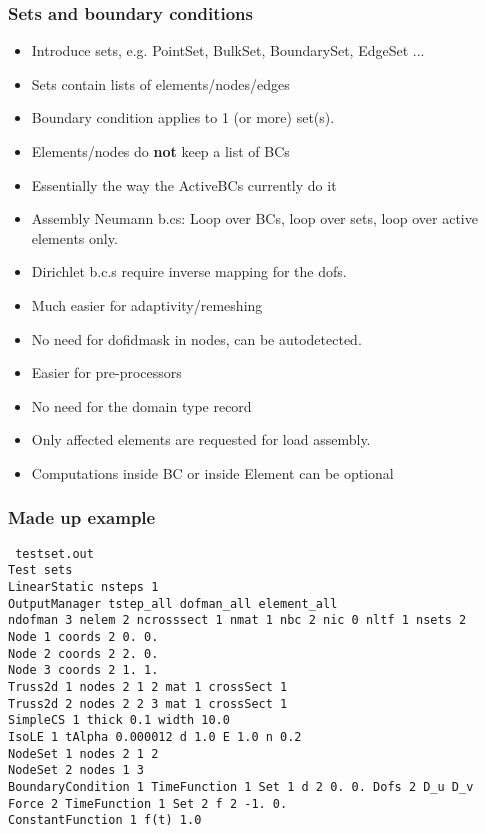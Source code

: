 \documentclass[11pt]{beamer} %
\begin{document}
\begin{frame}
 \frametitle{Sets and boundary conditions}
\begin{itemize}
 \item Introduce sets, e.g. PointSet, BulkSet, BoundarySet, EdgeSet ...
 \item Sets contain lists of elements/nodes/edges
 \item Boundary condition applies to 1 (or more) set(s).
 \item Elements/nodes do \textbf{not} keep a list of BCs
 \item Essentially the way the ActiveBCs currently do it
 \item Assembly Neumann b.cs: Loop over BCs, loop over sets, loop over active elements only.
 \item Dirichlet b.c.s require inverse mapping for the dofs.
\end{itemize}
\begin{itemize}
 \item[\smiley] Much easier for adaptivity/remeshing
 \item[\smiley] No need for dofidmask in nodes, can be autodetected.
 \item[\smiley] Easier for pre-processors
 \item[\smiley] No need for the domain type record
 \item[\smiley] Only affected elements are requested for load assembly.
 \item[\smiley] Computations inside BC or inside Element can be optional
\end{itemize}
\end{frame}

\begin{frame}
 \frametitle{Made up example}
 \texttt{\footnotesize
  testset.out\\
  Test sets\\
  LinearStatic nsteps 1\\
  OutputManager tstep\_all dofman\_all element\_all\\
  ndofman 3 nelem 2 ncrosssect 1 nmat 1 nbc 2 nic 0 nltf 1 nsets 2\\
  Node 1 coords 2 0. 0.\\
  Node 2 coords 2 2. 0.\\
  Node 3 coords 2 1. 1.\\
  Truss2d 1 nodes 2 1 2 mat 1 crossSect 1\\
  Truss2d 2 nodes 2 2 3 mat 1 crossSect 1\\
  SimpleCS 1 thick 0.1 width 10.0\\
  IsoLE 1  tAlpha 0.000012  d 1.0  E 1.0  n 0.2 \\
  NodeSet 1 nodes 2 1 2\\
  NodeSet 2 nodes 1 3\\
  BoundaryCondition 1 TimeFunction 1 Set 1 d 2 0. 0. Dofs 2 D\_u D\_v\\
  Force 2 TimeFunction 1 Set 2 f 2 -1. 0.\\
  ConstantFunction 1 f(t) 1.0\\
}
\end{frame}
\end{document}
